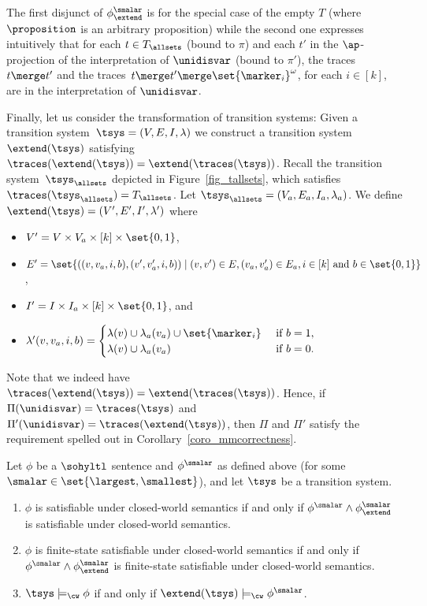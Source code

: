 The first disjunct of $\phi_\extend^{\smalar}$ is for the special case of the empty $T$ (where $\proposition$ is an arbitrary proposition) while the second one expresses intuitively that for each $t \in T_\allsets$ (bound to $\pi$) and each $t'$ in the $\ap$-projection of the interpretation of $\unidisvar$ (bound to $\pi'$), the traces~$t\merge t'$ and the traces~$t\merge t'{}\merge \set{\marker_i}^\omega$, for each $i \in [k]$, are in the interpretation of $\unidisvar$.

Finally, let us consider the transformation of transition systems: Given a transition system~$\tsys = (V, E, I, \lambda)$ we construct a transition system~$\extend(\tsys)$ satisfying $\traces(\extend(\tsys)) = \extend(\traces(\tsys))$.
Recall the transition system~$\tsys_\allsets$ depicted in Figure~\ref{fig_tallsets}, which satisfies $\traces(\tsys_\allsets) = T_\allsets$. 
Let $\tsys_\allsets = (V_a, E_a, I_a,\lambda_a)$.
We define $\extend(\tsys) = (V', E', I', \lambda')$ where 
\begin{itemize}
    \item $V' = V \times V_a \times [k] \times\set{0,1} $,
    \item $E' = \set{((v,v_a,i,b),(v',v_a',i,b)) \mid (v,v') \in E, (v_a, v_a') \in E_a, i \in [k] \text{ and } b \in \set{0,1} }$,
    \item $I' = I \times I_a \times [k] \times\set{0,1} $, and
    \item $\lambda'(v,v_a,i,b) = 
    \begin{cases}
        \lambda(v) \cup \lambda_a(v_a) \cup \set{\marker_i} &\text{ if } b=1,\\
        \lambda(v) \cup \lambda_a(v_a)  &\text{ if } b=0.
    \end{cases}$
\end{itemize}
Note that we indeed have $
\traces(\extend(\tsys)) = \extend(\traces(\tsys))$.
Hence, if $\Pi(\unidisvar) = \traces(\tsys)$ and $\Pi'(\unidisvar) = \traces(\extend(\tsys))$, then $\Pi$ and $\Pi'$ satisfy the requirement spelled out in Corollary~\ref{coro_mmcorrectness}.

\begin{lem}
\label{lem_so2sofp}
Let $\phi$ be a $\sohyltl$ sentence and $\phi^{\smalar}$ as defined above (for some $\smalar \in \set{\largest,\smallest}$), and let $\tsys$ be a transition system.
\begin{enumerate}
    \item\label{lem_so2sofp_sat} $\phi$ is satisfiable under closed-world semantics if and only if $\phi^{\smalar} \wedge \phi_\extend^{\smalar}$ is satisfiable under closed-world semantics.
    \item\label{lem_so2sofp_fssat} $\phi$ is finite-state satisfiable under closed-world semantics if and only if $\phi^{\smalar} \wedge \phi_\extend^{\smalar}$ is finite-state satisfiable under closed-world semantics. 
    \item\label{lem_so2sofp_mc} $\tsys \models_\cw \phi$ if and only if $\extend(\tsys) \models_\cw \phi^{\smalar}$.  
\end{enumerate}
\end{lem}

